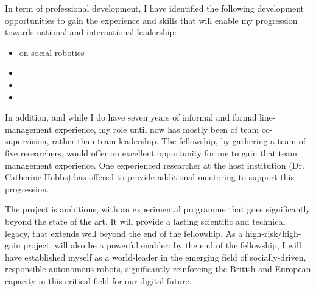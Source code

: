 In term of professional development, I have identified the following development
opportunities to gain the experience and skills that will enable my progression
towards national and international leadership:

\begin{itemize}
    \item {} on social robotics
    \item {}
    \item {}
    \item {}
\end{itemize}

In addition, and while I do have seven years of informal and formal
line-management experience, my role until now has mostly been of team
co-supervision, rather than team leadership. The fellowship, by gathering a
team of five researchers, would offer an excellent opportunity for me to gain
that team management experience. One experienced researcher at the host
institution (Dr. Catherine Hobbs) has offered to provide additional mentoring to
support this progression.


The project is ambitious, with an experimental programme that goes significantly
beyond the state of the art. It will provide a lasting scientific and
technical legacy, that extends well beyond the end of the fellowship. As a
high-risk/high-gain project, \project will also be a powerful enabler: by the
end of the fellowship, I will have established myself as a world-leader in the
emerging field of socially-driven, responsible autonomous robots, significantly
reinforcing the British and European capacity in this critical field for our
digital future.



